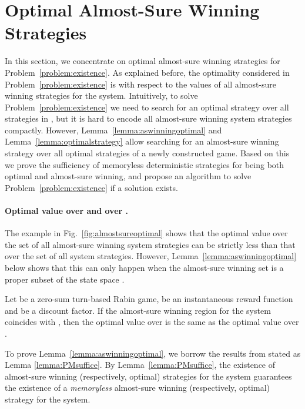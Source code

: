 \documentclass[runningheads,a4paper]{llncs}
\begin{document}
\section{Optimal Almost-Sure Winning Strategies}
\label{section:optimal}

In this section, we concentrate on optimal almost-sure winning strategies for Problem~\ref{problem:existence}. 
As explained before, the optimality considered in Problem~\ref{problem:existence} is with respect to the values of all almost-sure winning strategies for the system. Intuitively, to solve Problem~\ref{problem:existence} we need to search for an optimal strategy over all strategies in , but it is hard to encode all almost-sure winning system strategies compactly. However, Lemma~\ref{lemma:aswinningoptimal} and Lemma~\ref{lemma:optimalstrategy} allow searching for an almost-sure winning strategy over all optimal strategies of a newly constructed game. 
Based on this we prove the sufficiency of memoryless deterministic strategies for being both optimal and almost-sure winning, and propose an algorithm to solve Problem~\ref{problem:existence} if a solution exists. 





\paragraph{Optimal value over  and over .}
The example in Fig.~\ref{fig:almostsureoptimal} shows that the optimal value over the set  of all almost-sure winning system strategies can be strictly less than that over the set  of all system strategies. However, Lemma~\ref{lemma:aswinningoptimal} below shows that this can only happen when the almost-sure winning set  is a proper subset of the state space .

\begin{lemma}
Let  be a zero-sum turn-based Rabin game,  be an instantaneous reward function and  be a discount factor. 
If the almost-sure winning region  for the system coincides with , then the optimal value over  is the same as the optimal value over . 
\label{lemma:aswinningoptimal}
\end{lemma}



To prove Lemma~\ref{lemma:aswinningoptimal}, we borrow the results from \cite{chatterjee2005complexity, filar1996competitive} stated as Lemma \ref{lemma:PMsuffice}. 
By Lemma~\ref{lemma:PMsuffice}, the existence of almost-sure winning (respectively, optimal) strategies for the system guarantees the existence of a \emph{memoryless} almost-sure winning (respectively, optimal) strategy for the system. 
\end{document}
